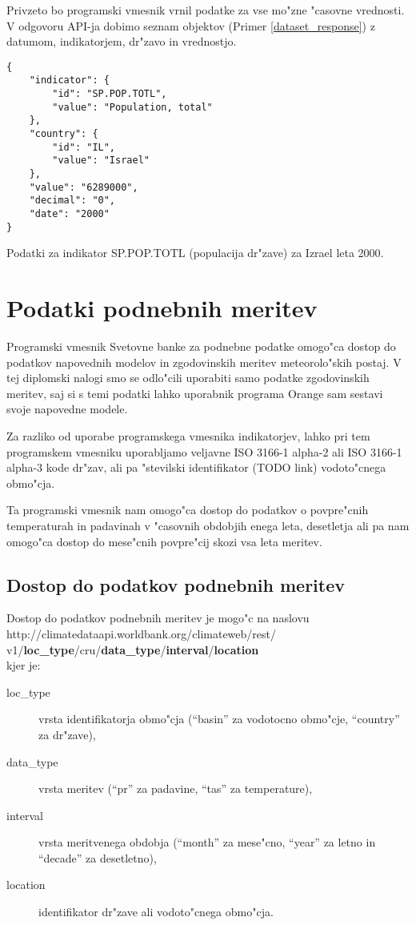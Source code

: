 Privzeto bo programski vmesnik vrnil podatke za vse mo"zne "casovne 
vrednosti. V odgovoru API-ja dobimo seznam objektov (Primer
\ref{dataset_response}) z datumom, indikatorjem, dr"zavo in vrednostjo.


\begin{snippet}
\begin{center}
\begin{lstlisting}
{
    "indicator": {
        "id": "SP.POP.TOTL",
        "value": "Population, total"
    },
    "country": {
        "id": "IL",
        "value": "Israel"
    },
    "value": "6289000",
    "decimal": "0",
    "date": "2000"
}
\end{lstlisting}
\end{center}
\caption{Podatki za indikator SP.POP.TOTL (populacija dr"zave) za Izrael leta
2000.}
\label{dataset_response}
\end{snippet} 


\section{Podatki podnebnih meritev}

Programski vmesnik Svetovne banke za podnebne podatke omogo"ca dostop do 
podatkov napovednih modelov in zgodovinskih meritev meteorolo"skih postaj. V tej 
diplomski nalogi smo se odlo"cili uporabiti samo podatke zgodovinskih meritev, 
saj si s temi podatki lahko uporabnik programa Orange sam sestavi svoje 
napovedne modele.

Za razliko od uporabe programskega vmesnika indikatorjev, lahko pri tem
programskem vmesniku uporabljamo veljavne ISO 3166-1 alpha-2 ali ISO 3166-1 
alpha-3 kode dr"zav, ali pa "stevilski identifikator (TODO link) vodoto"cnega 
obmo"cja.

Ta programski vmesnik nam omogo"ca dostop do podatkov o povpre"cnih temperaturah 
in padavinah v "casovnih obdobjih enega leta, desetletja ali pa nam omogo"ca 
dostop do mese"cnih povpre"cij skozi vsa leta meritev.


\subsection{Dostop do podatkov podnebnih meritev}

Dostop do podatkov podnebnih meritev je mogo"c na naslovu \\
http://climatedataapi.worldbank.org/climateweb/rest/\\
v1/\textbf{loc\_type}/cru/\textbf{data\_type}/\textbf{interval}/\textbf{location}\\
kjer je:
\begin{description}
\item [loc\_type] vrsta identifikatorja obmo"cja (``basin'' za vodotocno obmo"cje, 
  ``country'' za dr"zave),
\item [data\_type] vrsta meritev (``pr'' za padavine, ``tas'' za temperature),
\item [interval] vrsta meritvenega obdobja (``month'' za mese"cno, ``year'' za letno in
  ``decade'' za desetletno),
\item [location] identifikator dr"zave ali vodoto"cnega obmo"cja.
\end{description}


